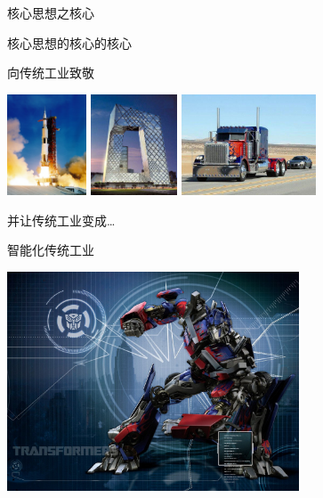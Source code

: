\documentclass[]{beamer}
\begin{document}
\begin{frame}{核心思想之核心}
  \begin{block}{核心思想的核心的核心}
    \begin{center}
      \Huge 向传统工业致敬
    \end{center}
  \end{block}
  \begin{center}
    \includegraphics[height=3cm]{spacecraft.jpg}
    \includegraphics[height=3cm]{cctv.jpg}
    \includegraphics[height=3cm]{prime_trunk.jpg}

    并让传统工业变成\dots
  \end{center}
\end{frame}

\begin{frame}{智能化传统工业}
  \begin{center}
    \includegraphics[height=6.5cm]{prime_robot.jpg}
  \end{center}
\end{frame}
\end{document}
